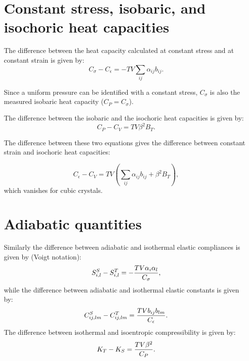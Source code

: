 \documentclass[12pt,a4paper,twoside]{report}
\begin{document}
\newpage
{\color{dark-blue}\chapter{Constant stress, isobaric, and isochoric 
heat capacities}}
\color{black}

The difference between the heat capacity calculated at constant stress
and at constant strain is given by:
\begin{equation}
C_\sigma - C_\epsilon = - T V \sum_{ij} \alpha_{ij} b_{ij}.
\end{equation}

Since a uniform pressure can be identified with a constant stress, $C_\sigma$
is also the measured isobaric heat capacity ($C_P=C_\sigma$).

The difference between the isobaric and the isochoric heat capacities 
is given by:
\begin{equation}
C_P - C_V = T V \beta^2 B_T.
\end{equation}

The difference between these two equations gives the difference between
constant strain and isochoric heat capacities:

\begin{equation}
C_\epsilon - C_V =  T V \left( \sum_{ij} \alpha_{ij} b_{ij} + \beta^2 B_T
\right),
\end{equation}
which vanishes for cubic crystals.

\newpage
{\color{dark-blue}\chapter{Adiabatic quantities}}
\color{black}

Similarly the difference between adiabatic and isothermal 
elastic compliances is given by (Voigt notation):
\begin{equation}
S^S_{i,l} - S^T_{i,l} = - {T V \alpha_{i} \alpha_{l} \over C_\sigma},
\end{equation}
while the difference between adiabatic and isothermal elastic constants
is given by:
\begin{equation}
C^S_{ij,lm} - C^T_{ij,lm} =  {T V b_{ij} b_{lm} \over C_\epsilon}.
\end{equation}
The difference between isothermal and isoentropic compressibility is given
by:
\begin{equation}
K_T - K_S =  {T V \beta^2 \over C_P}.
\end{equation}
\end{document}
